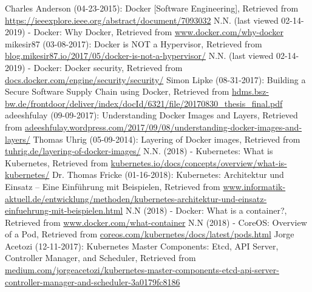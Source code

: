 \begin{thebibliography}{..........}
     	Charles Anderson (04-23-2015):
                           	Docker [Software Engineering],
                              	Retrieved from \url{https://ieeexplore.ieee.org/abstract/document/7093032}
     	N.N. (last viewed 02-14-2019) - Docker:
                           	Why Docker,
                              	Retrieved from \url{www.docker.com/why-docker}
     	mikesir87 (03-08-2017):
                           	Docker is NOT a Hypervisor,
                              	Retrieved from \url{blog.mikesir87.io/2017/05/docker-is-not-a-hypervisor/}
     	N.N. (last viewed 02-14-2019) - Docker:
                           	Docker security,
                              	Retrieved from \url{docs.docker.com/engine/security/security/}
    	Simon Lipke (08-31-2017):
                           	Building a Secure Software Supply Chain using Docker,
                              	Retrieved from \url{hdms.bsz-bw.de/frontdoor/deliver/index/docId/6321/file/20170830_thesis_final.pdf}
     	adeeshfulay (09-09-2017):
                           	Understanding Docker Images and Layers,
                              	Retrieved from \url{adeeshfulay.wordpress.com/2017/09/08/understanding-docker-images-and-layers/}
     	Thomas Uhrig (05-09-2014):
                           	Layering of Docker images,
                              	Retrieved from \url{tuhrig.de/layering-of-docker-images/}
    	N.N. (2018) - Kubernetes:
   				What is Kubernetes,
   				Retrieved from \url{kubernetes.io/docs/concepts/overview/what-is-kubernetes/}
   	Dr. Thomas Fricke (01-16-2018):
                              	Kubernetes: Architektur und Einsatz – Eine Einführung mit Beispielen,
                              	Retrieved from \url{www.informatik-aktuell.de/entwicklung/methoden/kubernetes-architektur-und-einsatz-einfuehrung-mit-beispielen.html}
   	N.N (2018) - Docker:
                              	What is a container?,
                              	Retrieved from \url{www.docker.com/what-container}
   	N.N (2018) - CoreOS:
                              	Overview of a Pod,
                              	Retrieved from \url{coreos.com/kubernetes/docs/latest/pods.html}
   	Jorge Acetozi (12-11-2017):
                              	Kubernetes Master Components: Etcd, API Server, Controller Manager, and Scheduler,
                              	Retrieved from \href{medium.com/jorgeacetozi/kubernetes-master-components-etcd-api-server-controller-manager-and-scheduler-3a0179fc8186}{medium.com/jorgeacetozi/kubernetes-master-components-etcd-api-server-controller-manager-and-scheduler-3a0179fc8186}

\end{thebibliography}
